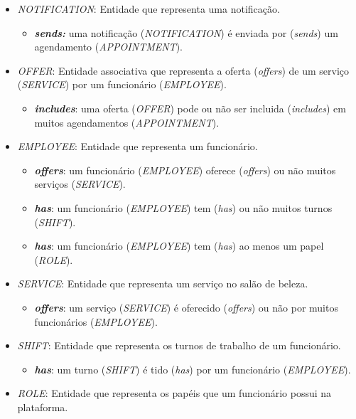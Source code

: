\begin{itemize}
\begin{itemize}
	\end{itemize}
	\item \emph{NOTIFICATION}: Entidade que representa uma notificação.
	\begin{itemize}
		\item \textbf{\textit{sends:}} uma notificação (\emph{NOTIFICATION}) é enviada por (\textit{sends}) um agendamento (\emph{APPOINTMENT}).
	\end{itemize}
	\item \emph{OFFER}: Entidade associativa que representa a oferta (\textit{offers}) de um serviço (\emph{SERVICE}) por um funcionário (\emph{EMPLOYEE}).
	\begin{itemize}
		\item \textbf{\textit{includes}}: uma oferta (\emph{OFFER}) pode ou não ser incluida (\textit{includes}) em muitos agendamentos (\emph{APPOINTMENT}). 
	\end{itemize}
	\item \emph{EMPLOYEE}: Entidade que representa um funcionário.
	\begin{itemize}
		\item \textbf{\textit{offers}}: um funcionário (\emph{EMPLOYEE}) oferece (\textit{offers}) ou não muitos serviços (\emph{SERVICE}).
		\item \textbf{\textit{has}}: um funcionário (\emph{EMPLOYEE}) tem (\textit{has}) ou não muitos turnos (\emph{SHIFT}).
		\item \textbf{\textit{has}}: um funcionário (\emph{EMPLOYEE}) tem (\textit{has}) ao menos um papel (\emph{ROLE}).
	\end{itemize}
	\item \emph{SERVICE}: Entidade que representa um serviço no salão de beleza.
	\begin{itemize}
		\item \textbf{\textit{offers}}: um serviço (\emph{SERVICE}) é oferecido (\textit{offers}) ou não por muitos funcionários (\emph{EMPLOYEE}).
	\end{itemize}
	\item \emph{SHIFT}: Entidade que representa os turnos de trabalho de um funcionário.
	\begin{itemize}
		\item \textbf{\textit{has}}: um turno (\emph{SHIFT}) é tido (\textit{has}) por um funcionário (\emph{EMPLOYEE}).
	\end{itemize}
	\item \emph{ROLE}: Entidade que representa os papéis que um funcionário possui na plataforma.
	\begin{itemize}

\end{itemize}
\end{itemize}
